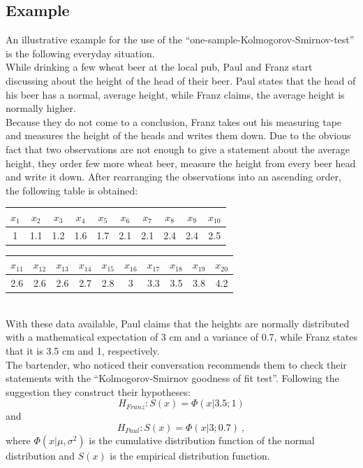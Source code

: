 \documentclass{article}
\begin{document}
\subsection{Example}
An illustrative example for the use of the ``one-sample-Kolmogorov-Smirnov-test'' is the following everyday situation.\\
While drinking a few wheat beer at the local pub, Paul and Franz start discussing about the height of the head of their beer.
Paul states that the head of his beer has a normal, average height, while Franz claims, the average height is normally higher.\\
Because they do not come to a conclusion, Franz takes out his measuring tape and measures the height of the heads and writes them down. Due to the obvious fact that two observations are not enough to give a statement about the average height, they order few more wheat beer, measure the height from every beer head and write it down.
After rearranging the observations into an ascending order, the following table is obtained:
\begin{table}[h]
\center
\begin{tabular}{c|c|c|c|c|c|c|c|c|c}
$x_1$	&$x_2$	&$x_3$	&$x_4$	&$x_5$	&$x_6$	&$x_7$	&$x_8$	&$x_9$	&$x_{10}$\\
\hline
1	&1.1	&1.2	&1.6	&1.7	&2.1	&2.1	&2.4	&2.4	&2.5	\\
\end{tabular}
\begin{tabular}{c|c|c|c|c|c|c|c|c|c}
$x_{11}$	&$x_{12}$	&$x_{13}$	&$x_{14}$	&$x_{15}$	&$x_{16}$	&$x_{17}$	&$x_{18}$	&$x_{19}$	&$x_{20}$\\
\hline
2.6	&2.6	&2.6	&2.7	&2.8	&3	&3.3	&3.5	&3.8	&4.2\\
\end{tabular}
\end{table}
\\
With these data available, Paul claims that the heights are normally distributed with a mathematical expectation of 3 cm and a variance of 0.7, while Franz states that it is 3.5 cm and 1, respectively.\\
The bartender, who noticed their conversation recommends them to check their statements with the ``Kolmogorov-Smirnov goodness of fit test''.
Following the suggestion they construct their hypotheses:
$$H_{Franz} : S(x) = \Phi (x|3.5;1)$$
and
$$H_{Paul} : S(x) = \Phi (x|3;0.7)~,$$
where $\Phi(x|\mu,\sigma^2)$ is the cumulative distribution function of the normal distribution and $S(x)$ is the empirical distribution function.\\
\end{document}
